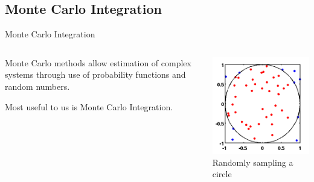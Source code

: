 \documentclass[10pt,compress,professionalfont]{beamer}
\begin{document}
\subsection{Monte Carlo Integration}
\begin{frame}{Monte Carlo Integration}


    \begin{columns}
        \begin{column}{0.6\textwidth}

    \vspace{-10mm}
    Monte Carlo methods allow estimation of complex systems through use of probability functions and random numbers.\\
    \vspace{8mm}

    Most useful to us is Monte Carlo Integration.

        \end{column}
        \begin{column}{0.4\textwidth}
            \vspace{-4mm}
            \includegraphics[width=\textwidth]{../img/external/MonteCarloIntegrationCircle}\\
            {\centering\scriptsize Randomly sampling a circle\\}
        \end{column}
    \end{columns}

\end{frame}
\end{document}
